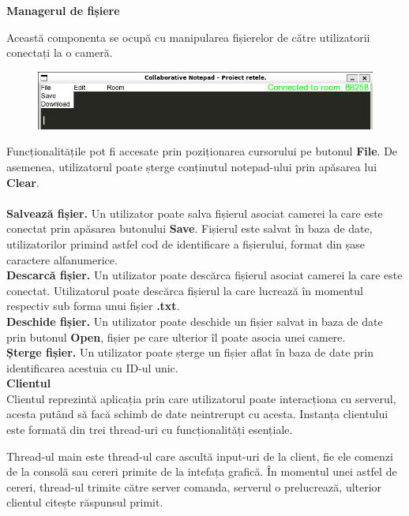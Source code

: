 \documentclass[runningheads]{llncs}
\begin{document}
{\bf \large Managerul de fișiere}

Această componenta se ocupă cu manipularea fișierelor de către utilizatorii conectați la o cameră.

\begin{figure}[htbp!]
    \hspace{-8px} 
    \includegraphics[scale=0.6]{camera3.png}
\end{figure}

Funcționalitățile pot fi accesate prin poziționarea cursorului pe butonul {\bf File}. De asemenea, utilizatorul poate șterge conținutul notepad-ului prin apăsarea lui {\bf Clear}.
\\\\

{\bf Salvează fișier.} Un utilizator poate salva fișierul asociat camerei la care este conectat prin apăsarea butonului {\bf Save}. Fișierul este salvat în baza de date, utilizatorilor primind astfel
cod de identificare a fișierului, format din șase carac\-tere alfanumerice.
\\

{\bf Descarcă fișier.} Un utilizator poate descărca fișierul asociat camerei la care este conectat. Utilizatorul poate descărca fișierul la care lucrează în momentul respectiv sub forma unui fișier {\bf .txt}.
\\

{\bf Deschide fișier.} Un utilizator poate deschide un fișier salvat in baza de date prin butonul {\bf Open}, fișier pe care ulterior îl poate asocia unei camere.
\\

{\bf Șterge fișier.} Un utilizator poate șterge un fișier aflat în baza de date prin identificarea acestuia cu ID-ul unic.
\\

\newpage
{\bf \large Clientul}
\\

Clientul reprezintă aplicația prin care utilizatorul poate interacționa cu serverul, acesta putând să facă schimb de date neintrerupt cu acesta.
Instanța clientului este formată din trei thread-uri cu funcționalități esențiale.

Thread-ul main este thread-ul care ascultă input-uri de la client, fie ele comenzi de la consolă sau cereri primite de la intefața grafică.
În momentul unei astfel de cereri, thread-ul trimite către server comanda, serverul o prelucrează, ulterior clientul citește răspunsul primit.
\end{document}
